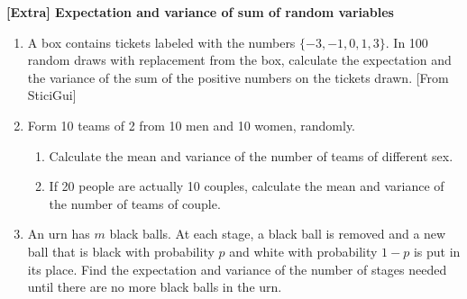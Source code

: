 \documentclass[12pt]{article}%
\newcommand{\0}{{\bf 0}}
\begin{document}
\begin{center}
{\Large{\bf [Extra] Expectation and variance of sum of random variables}} 
\end{center}


\begin{enumerate}



\item
A box contains tickets labeled with the numbers $\{-3, -1, 0, 1, 3\}$. 
In 100 random draws with replacement from the box, 
calculate the expectation and the variance of the sum of the positive numbers on the tickets drawn.
[From SticiGui]





\item
Form 10 teams of 2 from 10 men and 10 women, randomly.
\begin{enumerate}
\item
Calculate the mean and variance of the number of teams of different sex. 
\item
If 20 people are actually 10 couples,
calculate the mean and variance of the number of teams of couple. 
\end{enumerate}




\item
An urn has $m$ black balls. At each stage, a black ball is removed and a new ball that is black with
probability $p$ and white with probability $1-p$ is put in its place. Find 
the expectation and variance of the number of stages needed until there are no more black balls in the urn.



\end{enumerate}
\end{document}
